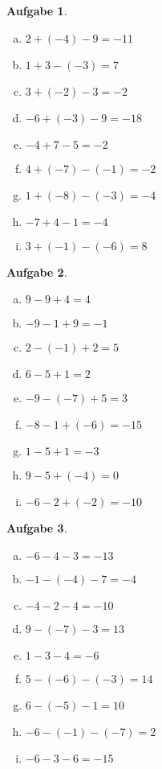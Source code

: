 \documentclass[12pt,fleqn]{article}
\theoremstyle{aufg}
\newtheorem{aufgabe}{Aufgabe}
\theoremstyle{bsp}
\begin{document}
\begin{flushleft}
\begin{aufgabe}
\begin{multicols}{3} 
\begin{enumerate}[a)] 
\item 
$2+(-4)-9=-11$
\item 
$1+3-(-3)=7$
\item 
$3+(-2)-3=-2$
\item 
$-6+(-3)-9=-18$
\item 
$-4+7-5=-2$
\item 
$4+(-7)-(-1)=-2$
\item 
$1+(-8)-(-3)=-4$
\item 
$-7+4-1=-4$
\item 
$3+(-1)-(-6)=8$
\end{enumerate} 
\end{multicols} 
\end{aufgabe} 
\begin{aufgabe} ~ \\ 
\begin{multicols}{3} 
\begin{enumerate}[a)] 
\item 
$9-9+4=4$
\item 
$-9-1+9=-1$
\item 
$2-(-1)+2=5$
\item 
$6-5+1=2$
\item 
$-9-(-7)+5=3$
\item 
$-8-1+(-6)=-15$
\item 
$1-5+1=-3$
\item 
$9-5+(-4)=0$
\item 
$-6-2+(-2)=-10$
\end{enumerate} 
\end{multicols} 
\end{aufgabe} 
\begin{aufgabe} ~ \\ 
\begin{multicols}{3} 
\begin{enumerate}[a)] 
\item 
$-6-4-3=-13$
\item 
$-1-(-4)-7=-4$
\item 
$-4-2-4=-10$
\item 
$9-(-7)-3=13$
\item 
$1-3-4=-6$
\item 
$5-(-6)-(-3)=14$
\item 
$6-(-5)-1=10$
\item 
$-6-(-1)-(-7)=2$
\item 
$-6-3-6=-15$
\end{enumerate} 
\end{multicols} 
\end{aufgabe} 
\end{flushleft} 
\end{document}
